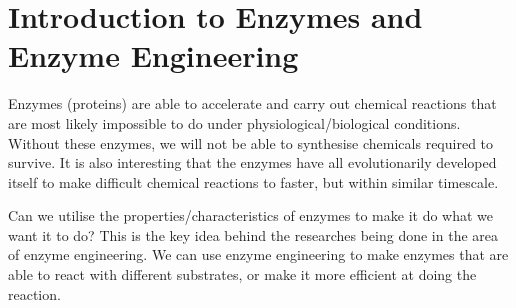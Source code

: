 \section{Introduction to Enzymes and Enzyme Engineering}

Enzymes (proteins) are able to accelerate and carry out chemical reactions that are most likely impossible to do under physiological/biological conditions.
Without these enzymes, we will not be able to synthesise chemicals required to survive.
It is also interesting that the enzymes have all evolutionarily developed itself to make difficult chemical reactions to faster, but within similar timescale.

Can we utilise the properties/characteristics of enzymes to make it do what we want it to do?
This is the key idea behind the researches being done in the area of enzyme engineering.
We can use enzyme engineering to make enzymes that are able to react with different substrates, or make it more efficient at doing the reaction.

